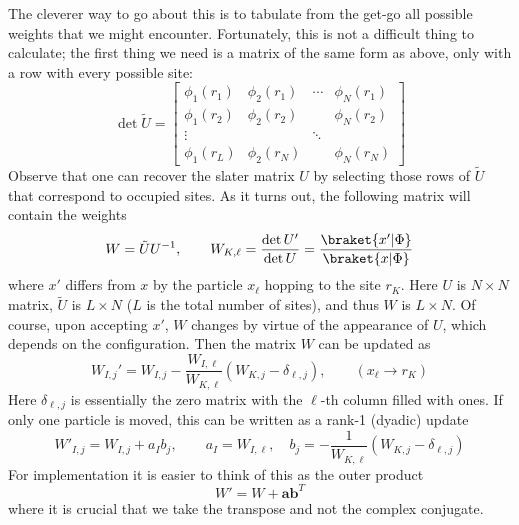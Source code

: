 \documentclass{report}
\begin{document}
The cleverer way to go about this is to tabulate from the get-go all possible
weights that we might encounter. Fortunately, this is not a difficult thing 
to calculate; the first thing we need is a matrix of the same form as above, 
only with a row with every possible site: 
\begin{equation*}
	\det \tilde{U} = 
	\begin{bmatrix}
		\phi_1(r_1) & \phi_2(r_1) & \cdots & \phi_N(r_1)\\ 
		\phi_1(r_2) & \phi_2(r_2) &        & \phi_N(r_2)\\ 
		\vdots      &             & \ddots &            \\ 
		\phi_1(r_L) & \phi_2(r_N) &        & \phi_N(r_N)
	\end{bmatrix}
\end{equation*}
Observe that one can recover the slater matrix $ U $ by selecting those 
rows of $ \tilde{U} $ that correspond to occupied sites.
As it turns out, the following matrix will contain the weights 
\begin{equation}\label{eq:vmc-weight}
	W = \tilde{U} U^{-1},\qquad 
	W_{K,\ell} = \frac{\det U'}{\det U}
		= \frac{\braket{x'\vert \Phi}}{\braket{x \vert \Phi}}
\end{equation}
where $ x' $ differs from $ x $ by the particle $ x_\ell $ hopping to the site 
$ r_K $. Here $ U $ is $ N \times N$ matrix, $ \tilde{U} $ is $ L\times N $
($ L $ is the total number of sites), and thus $ W $ is $ L\times N$.
Of course, upon accepting $ x' $, $ W $ changes by virtue of the appearance of 
$ U $, which depends on the configuration. Then the matrix $ W $ can be updated 
as 
\begin{equation*}
	W_{I,j}' 
		= W_{I,j} - \frac{W_{I,\ell}}{W_{K,\ell}} (W_{K,j} - \delta_{\ell,j}),
		\qquad ( x_\ell \to r_K )
\end{equation*}
Here $ \delta_{\ell, j}$ is essentially the zero matrix with the $ \ell $-th 
column filled with ones. If only one particle is moved, this can be written 
as a rank-1 (dyadic) update 
\begin{equation*}
	W'_{I,j} = W_{I,j} + a_I b_j,\qquad 
	a_I = W_{I,\ell},\quad b_j = - \frac{1}{W_{K,\ell}}(W_{K,j}- \delta_{\ell, j})
\end{equation*}
For implementation it is easier to think of this as the outer product
\begin{equation*}
	W' = W + \mathbf{a} \mathbf{b}^T
\end{equation*}
where it is crucial that we take the transpose and not the complex conjugate. 
\end{document}
